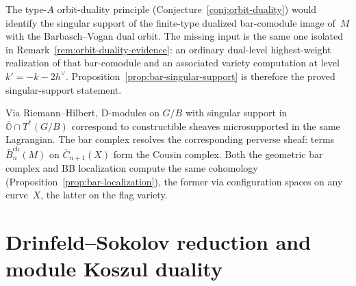 \begin{remark}
\label{rem:singular-support-dual-level-conjectural}
The type-$A$ orbit-duality principle
\textup{(}Conjecture~\textup{\ref{conj:orbit-duality}}\textup{)}
would identify the singular support of the finite-type dualized
bar-comodule image of~$M$ with the Barbasch--Vogan dual orbit. The
missing input is the same one isolated in
Remark~\ref{rem:orbit-duality-evidence}: an ordinary dual-level
highest-weight realization of that bar-comodule and an associated
variety computation at level~$k'=-k-2h^\vee$.
Proposition~\ref{prop:bar-singular-support} is therefore the proved
singular-support statement.
\end{remark}

\begin{remark}
\label{rem:microlocal-viewpoint}
Via Riemann--Hilbert, D-modules on $G/B$ with singular support in $\overline{\mathbb{O}} \cap T^*(G/B)$ correspond to constructible sheaves microsupported in the same Lagrangian. The bar complex resolves the corresponding perverse sheaf: terms $\bar{B}_n^{\mathrm{ch}}(M)$ on $\overline{C}_{n+1}(X)$ form the Cousin complex. Both the geometric bar complex and BB localization compute the same cohomology (Proposition~\ref{prop:bar-localization}), the former via configuration spaces on any curve~$X$, the latter on the flag variety.
\end{remark}

\section{Drinfeld--Sokolov reduction and module Koszul duality}
\label{sec:ds-module-kd}

